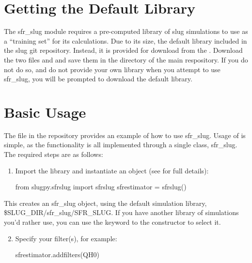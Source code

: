\documentclass[letterpaper,10pt,english]{sphinxmanual}
\begin{document}
\section{Getting the Default Library}
\label{\detokenize{sfr_slug:getting-the-default-library}}
The sfr\_slug module requires a pre-computed library of slug simulations to use as a “training set” for its calculations. Due to its size, the default library  included in the slug git repository. Instead, it is provided for download from the . Download the two files  and  and save them in the  directory of the main respository. If you do not do so, and do not provide your own library when you attempt to use sfr\_slug, you will be prompted to download the default library.


\section{Basic Usage}
\label{\detokenize{sfr_slug:basic-usage}}
The  file in the repository provides an example of how to use sfr\_slug. Usage of is simple, as the functionality is all implemented through a single class, sfr\_slug. The required steps are as follows:
\begin{enumerate}
\item {} 
Import the library and instantiate an  object (see {\hyperref[\detokenize{sfr_slug:sec-sfr-slug-full}]{}} for full details):

\begin{sphinxVerbatim}[commandchars=\\\{\}]
from slugpy.sfr\PYGZus{}slug import sfr\PYGZus{}slug
sfr\PYGZus{}estimator = sfr\PYGZus{}slug()
\end{sphinxVerbatim}

\end{enumerate}

This creates an sfr\_slug object, using the default simulation library, \$SLUG\_DIR/sfr\_slug/SFR\_SLUG. If you have another library of simulations you’d rather use, you can use the  keyword to the  constructor to select it.
\begin{enumerate}
\setcounter{enumi}{1}
\item {} 
Specify your filter(s), for example:

\begin{sphinxVerbatim}[commandchars=\\\{\}]
sfr\PYGZus{}estimator.add\PYGZus{}filters(\PYGZsq{}QH0\PYGZsq{})
\end{sphinxVerbatim}

\end{enumerate}
\end{document}
